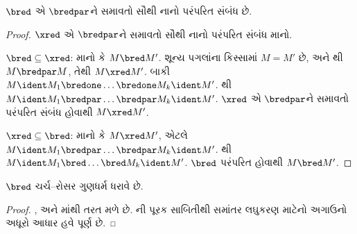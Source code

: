 \documentclass[../../../include/open-logic-section]{subfiles}
\begin{document}
\begin{lem}
  $\bred$ એ $\bredpar$ને સમાવતો સૌથી નાનો
  પરંપરિત સંબંધ છે.
\end{lem}

\begin{proof}
  $\xred$ એ $\bredpar$ને સમાવતો સૌથી નાનો
  પરંપરિત સંબંધ માનો.

  $\bred \subseteq \xred$: માનો કે $M \bred M'$.
  શૂન્ય પગલાંના કિસ્સામાં $M=M'$ છે, અને
  થી $M \bredpar M$, તેથી
  $M \xred M'$. બાકી $M \ident M_1
  \bredone \dots \bredone M_k \ident M'$.
  થી $M \ident M_1
  \bredpar \dots \bredpar M_k \ident M'$.
  $\xred$ એ $\bredpar$ને સમાવતો પરંપરિત
  સંબંધ હોવાથી $M \xred M'$.

  $\xred \subseteq \bred$: માનો કે $M \xred M'$,
  એટલે $M \ident M_1 \bredpar \dots
  \bredpar M_k \ident M'$. થી
  $M \ident M_1 \bred \dots \bred
  M_k \ident M'$. $\bred$ પરંપરિત હોવાથી
  $M \bred M'$.
\end{proof}

\begin{thm}
  $\bred$ ચર્ચ--રોસર ગુણધર્મ ધરાવે છે.
\end{thm}

\begin{proof}
  ,  અને
  માંથી તરત મળે છે.
  ની પૂરક સાબિતીથી
  સમાંતર લઘુકરણ માટેનો અગાઉનો અધૂરો આધાર હવે પૂર્ણ છે.
\end{proof}
\end{document}
